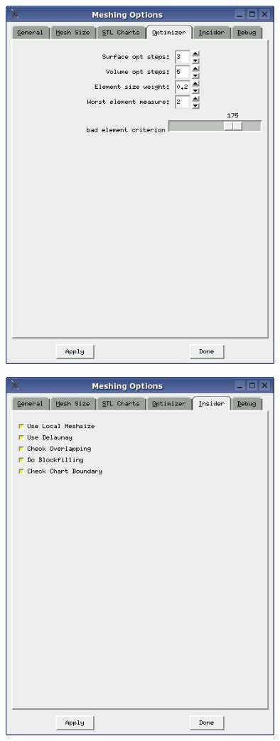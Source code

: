 \documentclass[12pt]{book}
\begin{document}
\includegraphics[width=10cm]{pictures/meshingoptions_4} 

\includegraphics[width=10cm]{pictures/meshingoptions_5} 
\end{document}
